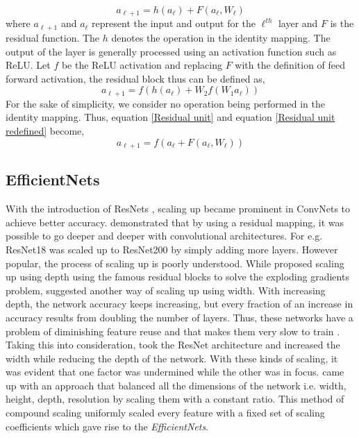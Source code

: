 \documentclass[fleqn,usenatbib]{mnras}
\begin{document}
\begin{equation}
    a_{\ell+1} = h(a_\ell) + F(a_\ell, W_\ell)
    \label{Residual unit}
\end{equation}
where $a_{\ell+1}$ and $a_\ell$ represent the input and output for the $\ell^{th}$ layer and $F$ is the residual function. The $h$ denotes the operation in the identity mapping. The output of the layer is generally processed using an activation function such as ReLU. Let $f$ be the ReLU activation and replacing $F$ with the definition of feed forward activation, the residual block thus can be defined as, 
\begin{equation}
    a_{\ell+1} = f(h(a_\ell) + W_2f(W_1a_\ell))
    \label{Residual unit redefined}
\end{equation}
For the sake of simplicity, we consider no operation being performed in the identity mapping. Thus, equation \ref{Residual unit} and equation \ref{Residual unit redefined} become,
\begin{equation}
    a_{\ell+1} = f(a_\ell + F(a_\ell, W_\ell))
    \label{Final Residual notation}
\end{equation}
\subsection{EfficientNets}
\hspace{0.25 in}With the introduction of ResNets \citep{he2016}, scaling up became prominent in ConvNets to achieve better accuracy. \citet{he2016} demonstrated that by using a residual mapping, it was possible to go deeper and deeper with convolutional architectures. For e.g. ResNet18 was scaled up to ResNet200 by simply adding more layers. However popular, the process of scaling up is poorly understood. While \citet{he2016} proposed scaling up using depth using the famous residual blocks to solve the exploding gradients problem, \citet{Zagoruyko_2016} suggested another way of scaling up using width. With increasing depth, the network accuracy keeps increasing, but every fraction of an increase in accuracy results from doubling the number of layers. Thus, these networks have a problem of diminishing feature reuse and that makes them very slow to train \citep{Zagoruyko_2016}. Taking this into consideration, \citet{Zagoruyko_2016} took the ResNet architecture and increased the width while reducing the depth of the network. With these kinds of scaling, it was evident that one factor was undermined while the other was in focus. \citet{tan2019efficientnet} came up with an approach that balanced all the dimensions of the network i.e. width, height, depth, resolution by scaling them with a constant ratio. This method of compound scaling uniformly scaled every feature with a fixed set of scaling coefficients which gave rise to the \textit{EfficientNets}. 
\end{document}
